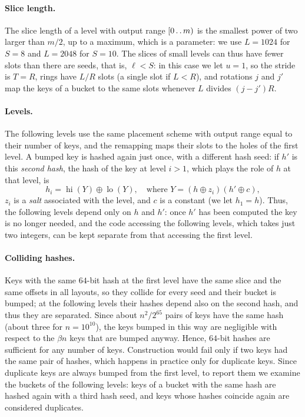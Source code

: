 \documentclass[11pt]{article}
\def\..{\,\mathpunct{\ldotp\ldotp}} %
\newcommand{\hi}{\operatorname{hi}}
\begin{document}
\paragraph{Slice length.}
The slice length of a level with output range $[0\..m)$ is the smallest power
of two larger than $m/2$, up to a maximum, which is a parameter: we use
$L=1024$ for $S=8$ and $L=2048$ for $S=10$. The
slices of small levels can thus have fewer slots than there are seeds, that
is, $\ell<S$: in this case we let $u=1$, so the stride is $T=R$, rings have
$L/R$ slots (a single slot if $L<R$), and rotations $j$ and $j'$ map the
keys of a bucket to the same slots whenever $L$ divides $(j-j')R$.

\paragraph{Levels.}
The following levels use the same placement scheme with output range equal
to their number of keys, and the remapping maps their slots to the holes of
the first level. A bumped key is hashed again just once, with a different
hash seed: if $h'$ is this \emph{second hash}, the hash of the key at level
$i>1$, which plays the role of $h$ at that level, is
\[
h_i=\hi(Y)\oplus\operatorname{lo}(Y),\quad\text{where $Y=(h\oplus z_i)(h'\oplus c)$},
\]
$z_i$ is a \emph{salt} associated with the level, and $c$ is a constant (we
let $h_1=h$). Thus, the following levels depend only on $h$ and $h'$: once $h'$ has
been computed the key is no longer needed, and the code accessing the
following levels, which takes just two integers, can be kept separate from
that accessing the first level.

\paragraph{Colliding hashes.}
Keys with the same $64$-bit hash at the first level have the same slice and
the same offsets in all layouts, so they collide for every seed and their
bucket is bumped; at the following levels their hashes depend also on the
second hash, and thus they are separated. Since about $n^2/2^{65}$ pairs of
keys have the same hash (about three for $n=10^{10}$), the keys bumped in this
way are negligible with respect to the $\beta n$ keys that are bumped anyway.
Hence, $64$-bit hashes are sufficient for any number of keys. Construction would fail only if two keys had the same pair of
hashes, which happens in practice only for duplicate keys. Since duplicate
keys are always bumped from the first level, to report them we examine the
buckets of the following levels: keys of a bucket with the same hash are
hashed again with a third hash seed, and keys whose hashes coincide again are considered
duplicates.
\end{document}
